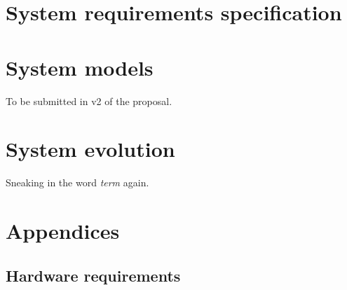 \documentclass[12pt]{article}
\begin{document}
\section{System requirements specification}

\section{System models}
To be submitted in v2 of the proposal.

\section{System evolution}
Sneaking in the word {\it \gls{term}} again.

\section{Appendices}

\subsection{Hardware requirements}

\printindex




\end{document}
